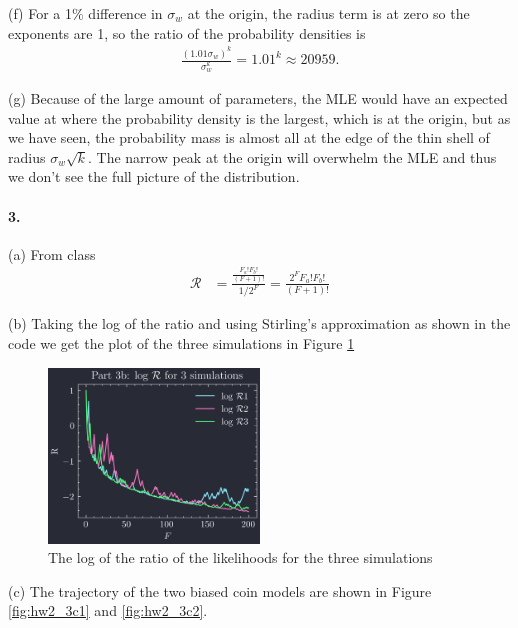 \documentclass[../main.tex]{subfiles}
\begin{document}
(f) For a 1\% difference in $\sigma_w$ at the origin, the radius term is at zero so the exponents 
are 1, so the ratio of the probability densities is
\begin{align*}
    \frac{(1.01\sigma_w)^k}{\sigma_w^k} = 1.01^{k} \approx 20959.
\end{align*}

(g) Because of the large amount of parameters, the MLE would have an expected value at where the
probability density is the largest, which is at the origin, but as we have seen, the probability 
mass is almost all at the edge of the thin shell of radius $\sigma_w \sqrt k$. The narrow peak 
at the origin will overwhelm the MLE and thus we don't see the full picture of the distribution.

\newpage
\paragraph*{3.} 

(a) From class
\begin{align*}
    \mathcal{R} &= \frac{\frac{F_a! F_b!}{(F + 1)!}}{1/2^{F}} 
        = \frac{2^{F} F_a! F_b!}{(F + 1)!}
\end{align*}

(b) Taking the log of the ratio and using Stirling's approximation as shown in the code we get the
plot of the three simulations in Figure \ref{fig:hw2_3b}

\begin{figure}[ht]
    \centering
    \includegraphics[width=0.5\textwidth]{hw2_3b.png}
    \caption{The log of the ratio of the likelihoods for the three simulations}
    \label{fig:hw2_3b}
\end{figure}

(c) The trajectory of the two biased coin models are shown in Figure \ref{fig:hw2_3c1} and \ref{fig:hw2_3c2}.
\end{document}
